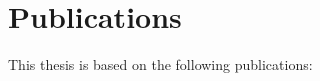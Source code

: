 \chapter*{Publications}



This thesis is based on the following publications:

%	

\begin{refsection}[ownpubs]
	\nocite{Policies, Tool, martin2020model, martin2020optimal, Martin} %
	\newrefcontext[sorting=ynt]
	\printbibliography[heading=none]%
\end{refsection}
